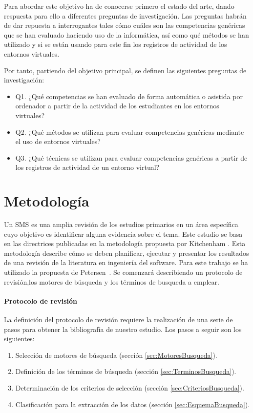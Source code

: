Para abordar este objetivo ha de conocerse primero el estado del arte, dando respuesta para ello a diferentes preguntas de investigación. Las preguntas habrán de dar repuesta a interrogantes tales cómo cuáles son las competencias genéricas que se han evaluado haciendo uso de la informática, así como qué métodos se han utilizado y si se están usando para este fin los registros de actividad de los entornos virtuales.

\bigskip
Por tanto, partiendo del objetivo principal, se definen las siguientes preguntas de investigación:
\begin{itemize}
\item Q1. ¿Qué competencias se han evaluado de forma automática o asistida por ordenador a partir de la actividad de los estudiantes en los entornos virtuales?
\item Q2. ¿Qué métodos se utilizan para evaluar competencias genéricas mediante el uso de entornos virtuales?
\item Q3. ¿Qué técnicas se utilizan para evaluar competencias genéricas a partir de los registros de actividad de un entorno virtual?
\end{itemize}

\section{Metodología}

Un SMS es una amplia revisión de los estudios primarios en un área específica cuyo objetivo es identificar alguna evidencia sobre el tema. Este estudio se basa en las directrices publicadas en la metodología propuesta por Kitchenham \cite{Kitchenham:2010}. Esta metodología describe cómo se deben planificar, ejecutar y presentar los resultados de una revisión de la literatura en ingeniería del software. Para este trabajo se ha utilizado la propuesta de Petersen~\cite{Petersen:2008}. Se comenzará describiendo un protocolo de revisión,los motores de búsqueda y los términos de busqueda a emplear.

\paragraph*{Protocolo de revisión}
La definición del protocolo de revisión requiere la realización de una serie de pasos para obtener la bibliografía de nuestro estudio. Los pasos a seguir son los siguientes:
\begin{enumerate}
\item Selección de motores de búsqueda (sección \ref{sec:MotoresBusqueda}).
\item Definición de los términos de búsqueda (sección \ref{sec:TerminosBusqueda}).
\item Determinación de los criterios de selección (sección \ref{sec:CriteriosBusqueda}).
\item Clasificación para la extracción de los datos (sección \ref{sec:EsquemaBusqueda}).
\end{enumerate}

